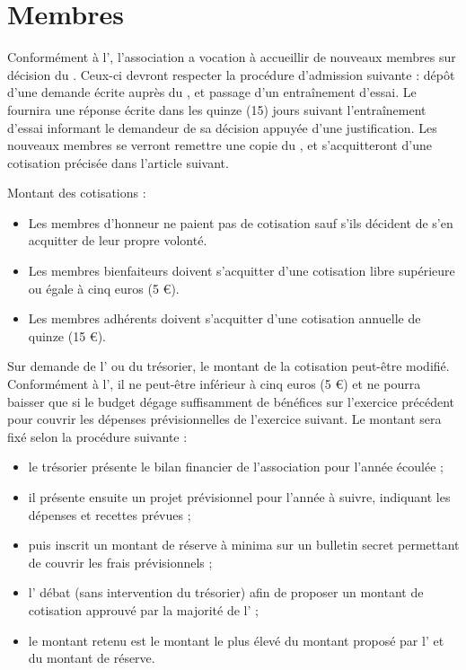 \setcounter{article}{1}
\section{Membres}

\label{sec:admiss-de-nouv}

Conformément à l', l'association \meta{} a vocation à accueillir de nouveaux membres sur décision du \bureau{}. Ceux-ci devront respecter la procédure d'admission suivante : dépôt d'une demande écrite auprès du \bureau{}, et passage d'un entraînement d'essai. Le \bureau{} fournira une réponse écrite dans les quinze (15) jours suivant l'entraînement d'essai informant le demandeur de sa décision appuyée d'une justification. Les nouveaux membres se verront remettre une copie du \RI{}, et s'acquitteront d'une cotisation précisée dans l'article suivant.

\label{sec:cotisation}
Montant des cotisations :

\begin{itemize}
\item Les membres d'honneur ne paient pas de cotisation sauf s'ils décident de s'en acquitter de leur propre volonté.
\item Les membres bienfaiteurs doivent s'acquitter d'une cotisation libre supérieure ou égale à cinq euros (5 \euro{}).
\item Les membres adhérents doivent s'acquitter d'une cotisation annuelle de quinze (15 \euro{}).
\end{itemize}


Sur demande de l'\AG{} ou du trésorier, le montant de la cotisation peut-être modifié. Conformément à l', il ne peut-être inférieur à cinq euros (5 \euro{}) et ne pourra baisser que si le budget dégage suffisamment de bénéfices sur l'exercice précédent pour couvrir les dépenses prévisionnelles de l'exercice suivant. Le montant sera fixé selon la procédure suivante :
\begin{itemize}
\item le trésorier présente le bilan financier de l'association pour l'année écoulée ;
\item il présente ensuite un projet prévisionnel pour l'année à suivre, indiquant les dépenses et recettes prévues ;
\item puis inscrit un montant de réserve à minima sur un bulletin secret permettant de couvrir les frais prévisionnels ;
\item l'\AG{} débat (sans intervention du trésorier) afin de proposer un montant de cotisation approuvé par la majorité de l'\AG{} ;
\item le montant retenu est le montant le plus élevé du montant proposé par l'\AG{} et du montant de réserve.
\end{itemize}

